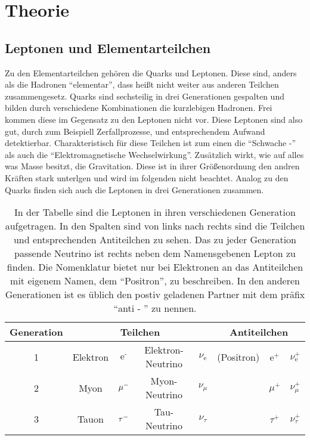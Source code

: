 \section{Theorie}
\subsection{Leptonen und Elementarteilchen}
Zu den Elementarteilchen gehören die Quarks und Leptonen. Diese sind, anders als die Hadronen \enquote{elementar}, dass heißt nicht weiter aus anderen Teilchen zusammengesetz. 
Quarks sind sechsteilig in drei Generationen gespalten und bilden durch verschiedene Kombinationen die kurzlebigen Hadronen. Frei kommen diese im Gegensatz zu den Leptonen nicht vor. 
Diese Leptonen sind also gut, durch zum Beispiell Zerfallprozesse, und entsprechendem Aufwand detektierbar. Charakteristisch für diese Teilchen ist zum einen die \enquote{Schwache -} als auch die 
\enquote{Elektromagnetische Wechselwirkung}. Zusätzlich wirkt, wie auf alles was Masse besitzt, die Gravitation. Diese ist in ihrer Größenordnung den andren Kräften stark unterlgen und wird im folgenden
nicht beachtet. Analog zu den Quarks finden sich auch die Leptonen in drei Generationen zusammen. 
\begin{table}
    \centering
    \caption{In der Tabelle sind die Leptonen in ihren verschiedenen Generation aufgetragen. In den Spalten sind von links nach rechts sind die Teilchen und entsprechenden Antiteilchen zu sehen.
            Das zu jeder Generation passende Neutrino ist rechts neben dem Namensgebenen Lepton zu finden. Die Nomenklatur bietet nur bei Elektronen an das Antiteilchen mit eigenem Namen, dem \enquote{Positron}, zu beschreiben. In den 
            anderen Generationen ist es üblich den postiv geladenen Partner mit dem präfix \enquote{anti - } zu nennen.}
    \label{tab:1}
    \begin{tabular}{c | c c c c | c c c}
        \toprule
        Generation &\multicolumn{4}{c}{Teilchen} & \multicolumn{3}{c}{Antiteilchen}  \\
        \midrule
        1      &       Elektron & $\text{e}^\text{-}$   &     Elektron-Neutrino  &  $\nu_\text{e}$  &    (Positron) & $\text{e}^\text{+}$  &   $\nu_\text{e}^\text{+}$  \\
        2      &      Myon & $\mu^{\--}$         &           Myon-Neutrino       &  $\nu_\mu$       &            & $\mu^\text{+}$       &   $\nu_\mu^\text{+}$        \\
        3      &      Tauon & $\tau^{\--} $         &       Tau-Neutrino         &  $\nu_\tau$      &            & $\tau^\text{+}$      &   $\nu_\tau^\text{+}$       \\
    \end{tabular}
\end{table}
